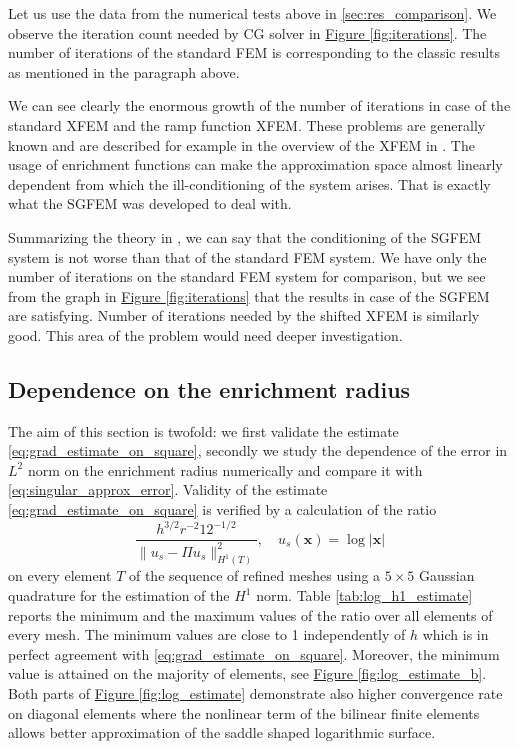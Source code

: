\documentclass{elsarticle}
\newcommand{\fig}[1]{\hyperref[#1]{Figure \ref{#1}}}
\def\vc#1{\mathbf{\boldsymbol{#1}}}     %
\def\abs#1{\left|#1\right|}
\def\abs#1{| #1 |}
\begin{document}
Let us use the data from the numerical tests above in \ref{sec:res_comparison}.
We observe the iteration count needed by CG solver in \fig{fig:iterations}.
The number of iterations of the standard FEM is corresponding to the classic results as mentioned in the paragraph above. 

%
We can see clearly the enormous growth of the number of iterations in case of the standard XFEM and the ramp 
function XFEM. These problems are generally known and are described for example in the overview of the XFEM in
\cite{fries_extended/generalized_2010}. The usage of enrichment functions can make the approximation space almost linearly 
dependent from which the ill-conditioning of the system arises. That is exactly what the SGFEM was developed to deal with.

Summarizing the theory in \cite{babuska_stable_2012}, we can say that the conditioning of the SGFEM system is not worse than that of the 
standard FEM system. We have only the number of iterations on the standard FEM system for comparison, 
but we see from the graph in \fig{fig:iterations} that the results in case of the SGFEM are satisfying.
Number of iterations needed by the shifted XFEM is similarly good. This area of the problem would need deeper 
investigation.


\subsection{Dependence on the enrichment radius}
The aim of this section is twofold: we first validate the estimate \eqref{eq:grad_estimate_on_square}, secondly we study 
the dependence of the error in $L^2$ norm on the enrichment radius numerically and compare it with \eqref{eq:singular_approx_error}.
%
%
%
Validity of the estimate \eqref{eq:grad_estimate_on_square} is verified by a calculation of the ratio
\begin{equation} \label{eqn:log_h1_estimate_ratio}
\frac{h^{3/2} r^{-2} 12^{-1/2}}{\|u_s - \Pi u_s\|^2_{H^1(T)}},\quad u_s(\vc x) = \log \abs{\vc x}
\end{equation}
on every element $T$ of the sequence of refined meshes using a $5\times5$ Gaussian quadrature for the estimation of the $H^1$ norm. Table 
\ref{tab:log_h1_estimate} reports the minimum and the maximum values of the ratio over all elements of every mesh.
The minimum values are close to 1 independently of $h$ which is in perfect agreement with \eqref{eq:grad_estimate_on_square}.
Moreover, the minimum value is attained on the majority of
elements, see \fig{fig:log_estimate_b}. Both parts of \fig{fig:log_estimate} demonstrate also higher convergence rate on diagonal elements
where the nonlinear term of the bilinear finite elements allows better approximation of the saddle shaped logarithmic surface.
\end{document}
